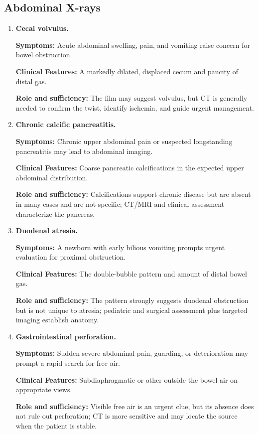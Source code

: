 \subsection{Abdominal X-rays}
\begin{enumerate}[leftmargin=*,itemsep=0.45em,topsep=0.4em]
\item \textbf{Cecal volvulus.}\par\noindent\textbf{Symptoms:} Acute abdominal swelling, pain, and vomiting raise concern for bowel obstruction.\par\noindent\textbf{Clinical Features:} A markedly dilated, displaced cecum and paucity of distal gas.\par\noindent\textbf{Role and sufficiency:} The film may suggest volvulus, but CT is generally needed to confirm the twist, identify ischemia, and guide urgent management.
\item \textbf{Chronic calcific pancreatitis.}\par\noindent\textbf{Symptoms:} Chronic upper abdominal pain or suspected longstanding pancreatitis may lead to abdominal imaging.\par\noindent\textbf{Clinical Features:} Coarse pancreatic calcifications in the expected upper abdominal distribution.\par\noindent\textbf{Role and sufficiency:} Calcifications support chronic disease but are absent in many cases and are not specific; CT/MRI and clinical assessment characterize the pancreas.
\item \textbf{Duodenal atresia.}\par\noindent\textbf{Symptoms:} A newborn with early bilious vomiting prompts urgent evaluation for proximal obstruction.\par\noindent\textbf{Clinical Features:} The double-bubble pattern and amount of distal bowel gas.\par\noindent\textbf{Role and sufficiency:} The pattern strongly suggests duodenal obstruction but is not unique to atresia; pediatric and surgical assessment plus targeted imaging establish anatomy.
\item \textbf{Gastrointestinal perforation.}\par\noindent\textbf{Symptoms:} Sudden severe abdominal pain, guarding, or deterioration may prompt a rapid search for free air.\par\noindent\textbf{Clinical Features:} Subdiaphragmatic or other outside the bowel air on appropriate views.\par\noindent\textbf{Role and sufficiency:} Visible free air is an urgent clue, but its absence does not rule out perforation; CT is more sensitive and may locate the source when the patient is stable.

\end{enumerate}
